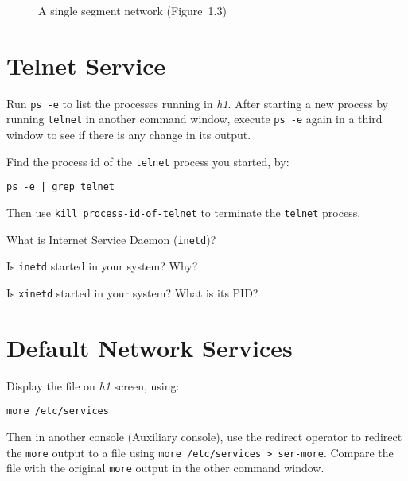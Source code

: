 \documentclass{../UTNetLab}
\begin{document}
\begin{center}
\begin{minipage}{0.48\textwidth}
\begin{flushright}
\begin{figure}[H]
                    \caption{A single segment network (Figure~1.3)}
                \end{figure}
            \end{flushright}
        \end{minipage}
    \end{center}

\section{Telnet Service}
    Run \lstinline{ps -e} to list the processes running in \textit{h1}.
    After starting a new process by running \lstinline{telnet} in another command window, execute \lstinline{ps -e} again in a third window to see if there is any change in its output.

    Find the process id of the \lstinline{telnet} process you started, by:
    \begin{lstlisting}
ps -e | grep telnet
    \end{lstlisting}
    Then use \lstinline[emph={process-id-of-telnet}]{kill process-id-of-telnet} to terminate the \lstinline{telnet} process.
    
    \begin{report}
    \item What is Internet Service Daemon (\lstinline{inetd})?

    \item Is \lstinline{inetd} started in your system?
    Why?

    \item Is \lstinline{xinetd} started in your system? What is its PID?
    \end{report}

\section{Default Network Services}
    Display the file  on \textit{h1} screen, using:
    \begin{lstlisting}
more /etc/services
    \end{lstlisting}
    Then in another console (Auxiliary console), use the redirect operator to redirect the \lstinline{more} output to
    a file using \lstinline{more /etc/services > ser-more}. Compare the file  with the original \lstinline{more} output in the other command window.
\end{document}
